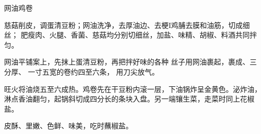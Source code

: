 \begin{recipe}{网油鸡卷}

\ingredients



\cooking

\step 慈菇削皮，调蛋清豆粉；网油洗净，去厚油边、去梗I鸡脯去膜和油筋，切成细丝；
肥瘦肉、火腿、香菌、慈菇均分别切细丝，加盐、味精、胡椒、料酒共同拌匀。

网油平铺案上，先抹上蛋清豆粉，再把拌好味的各种 丝子用网油裹起，裹成、三分厚、
一寸五宽的卷约四至六条， 用刀尖放气。

\step 旺火将油烧五至六成热。鸡卷先在干豆粉内滚一层，下油锅炸呈金黄色。泌炸油，
淋点香油翻匀，起锅斜切成四分长的条块入盘。另一端镶生菜，走菜时同上花椒盐。

\notes

皮酥、里嫩、色鲜、味美，吃时蘸椒盐。

\end{recipe}

